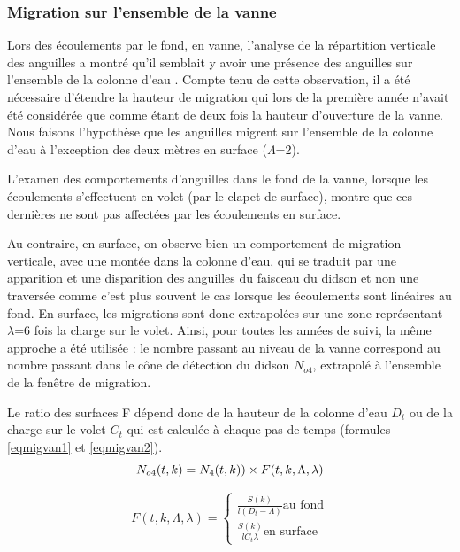 \documentclass[11pt,twocolumn,titlepage,twoside]{article}
\begin{document}
\subsubsection{Migration sur l'ensemble de la vanne}



Lors des écoulements par le fond, en vanne, l'analyse de la répartition
verticale des anguilles a montré qu'il semblait y avoir une présence des
anguilles sur l'ensemble de la colonne d'eau \citep{briand_suivi_2015}.
Compte tenu de cette observation, il a été nécessaire d'étendre la
hauteur de migration qui lors de la première année n'avait été considérée que comme étant
de deux fois la hauteur d'ouverture de la vanne. Nous faisons l'hypothèse que
les anguilles migrent sur l'ensemble de la colonne d'eau à l'exception des deux mètres en surface ($\Lambda$=2). 

L'examen des comportements d'anguilles dans
le fond de la vanne, lorsque les écoulements s'effectuent en volet (par le
clapet de surface), montre que ces dernières ne sont pas affectées par les écoulements en surface. 

Au contraire, en surface, on observe bien un comportement de migration
verticale, avec une montée dans la colonne d'eau, qui se traduit par une
apparition et une disparition des anguilles du faisceau du didson et non une
traversée comme c'est plus souvent le cas lorsque les écoulements sont linéaires
au fond. En surface, les migrations sont donc extrapolées sur une zone
représentant $\lambda$=6 fois la charge sur le volet. Ainsi, pour toutes les
années de suivi, la même approche a été utilisée : le nombre passant au niveau
de la vanne correspond au nombre passant dans le cône de détection du didson $N_{o4}$, 
extrapolé à l'ensemble de la fenêtre de migration.

Le ratio des surfaces F dépend donc de la hauteur de la colonne d'eau  $D_t$ ou
de la charge sur le volet $C_t$ qui est calculée à chaque pas de temps (formules
\ref{eqmigvan1} et \ref{eqmigvan2}). 
\begin{equation}
\label{eqmigvan1}
 N_{o4}(t,k)=N_4(t,k)) \times F(t,k,\Lambda,\lambda)\\
\end{equation}
 
 \begin{equation}
\label{eqmigvan2}
 F(t,k,\Lambda,\lambda)=
 \begin{cases}
\frac{S(k)}{l (D_t-\Lambda)} \text{au fond}\\
\frac{S(k)}{l C_t \lambda} \text{en surface}
\end{cases}
 \end{equation}
 
\end{document}
